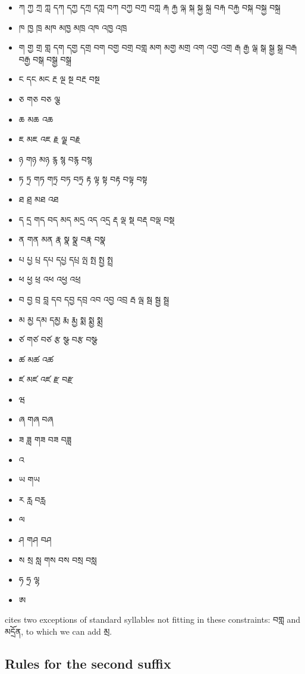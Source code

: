 \documentclass[%
a4paper,%
pagesize,%
12pt,%
parskip=off,%
bibliography=totoc,%
numbers=noenddot,%
DIV=12,%
twoside=semi,%
headings=normal%
]{scrartcl}
\begin{document}
\begin{itemize}
\item ཀ ཀྱ ཀྲ ཀླ དཀ དཀྱ དཀྲ དཀླ བཀ བཀྱ བཀྲ བཀླ རྐ རྐྱ ལྐ སྐ སྐྱ སྐྲ བརྐ བརྐྱ བསྐ བསྐྱ བསྐྲ
\item ཁ ཁྱ ཁྲ མཁ མཁྱ མཁྲ འཁ འཁྱ འཁྲ
\item ག གྱ གྲ གླ དག དགྱ དགྲ བག བགྱ བགྲ བགླ མག མགྱ མགྲ འག འགྱ འགྲ རྒ རྒྱ ལྒ སྒ སྒྱ སྒྲ བརྒ བརྒྱ བསྒ བསྒྱ བསྒྲ
\item ང དང མང རྔ ལྔ སྔ བརྔ བསྔ
\item ཅ གཅ བཅ ལྕ
\item ཆ མཆ འཆ
\item ཇ མཇ འཇ རྗ ལྗ བརྗ
\item ཉ གཉ མཉ རྙ སྙ བརྙ བསྙ
\item ཏ ཏྲ གཏ གཏྲ བཏ བཏྲ རྟ ལྟ སྟ བརྟ བལྟ བསྟ
\item ཐ ཐྲ མཐ འཐ
\item ད དྲ གད བད མད མདྲ འད འདྲ རྡ ལྡ སྡ བརྡ བལྡ བསྡ
\item ན གན མན རྣ སྣ སྣྲ བརྣ བསྣ
\item པ པྱ པྲ དཔ དཔྱ དཔྲ ལྤ སྤ སྤྱ སྤྲ
\item ཕ ཕྱ ཕྲ འཕ འཕྱ འཕྲ
\item བ བྱ བྲ བླ དབ དབྱ དབྲ འབ འབྱ འབྲ རྦ ལྦ སྦ སྦྱ སྦྲ
\item མ མྱ དམ དམྱ རྨ རྨྱ སྨ སྨྱ སྨྲ
\item ཙ གཙ བཙ རྩ སྩ བརྩ བསྩ
\item ཚ མཚ འཚ
\item ཛ མཛ འཛ རྫ བརྫ
\item ཝ
\item ཞ གཞ བཞ
\item ཟ ཟླ གཟ བཟ བཟླ
\item འ
\item ཡ གཡ
\item ར རླ བརླ
\item ལ
\item ཤ གཤ བཤ
\item ས སྲ སླ གས བས བསྲ བསླ
\item ཧ ཧྲ ལྷ
\item ཨ
\end{itemize}

\cite{TsheshabGrammarTopics} cites two exceptions of standard syllables not fitting in these constraints: བགླ and མདྲོན, to which we can add མྲ.

\subsection{Rules for the second suffix}
\end{document}
